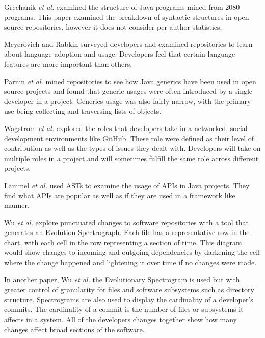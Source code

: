 \documentclass[conference]{IEEEtran}
\begin{document}
Grechanik \textit{et al.} \cite{Grechanik:2010:EIL:1852786.1852801} examined the structure of Java programs mined from 2080 programs. This paper examined the breakdown of syntactic structures in open source repositories, however it does not consider per author statistics. 

Meyerovich and Rabkin \cite{Meyerovich:2013:EAP:2509136.2509515} surveyed developers and examined repositories to learn about language adoption and usage. Developers feel that certain language features are more important than others.

Parnin \textit{et al.} \cite{Parnin:2011:JGA:1985441.1985446} mined repositories to see how Java generics have been used in open source projects and found that generic usages were often introduced by a single developer in a project. Generics usage was also fairly narrow, with the primary use being collecting and traversing lists of objects.

Wagstrom \textit{et al.} \cite{Patrick:Wagstrom:2012} explored the roles that developers take in a networked, social development environments like GitHub. These role were defined as their level of contribution as well as the types of issues they dealt with. Developers will take on multiple roles in a project and will sometimes fulfill the same role across different projects.

L\"{a}mmel \textit{et al.} \cite{Lammel:2011:LAA:1982185.1982471} used ASTs to examine the usage of APIs in Java projects. They find what APIs are popular as well as if they are used in a framework like manner.

Wu \textit{et al.} \cite{wu2004a} explore punctuated changes to software repositories with a tool that generates an Evolution Spectrograph. Each file has a representative row in the chart, with each cell in the row representing a section of time. This diagram would show changes to incoming and outgoing dependencies by darkening the cell where the change happened and lightening it over time if no changes were made.

In another paper, Wu \textit{et al.} \cite{wu2004} the Evolutionary Spectrogram is used but with greater control of granularity for files and software subsystems such as directory structure. Spectrograms are also used to display the cardinality of a developer’s commits. The cardinality of a commit is the number of files or subsystems it affects in a system. All of the developers changes together show how many changes affect broad sections of the software.
\end{document}
